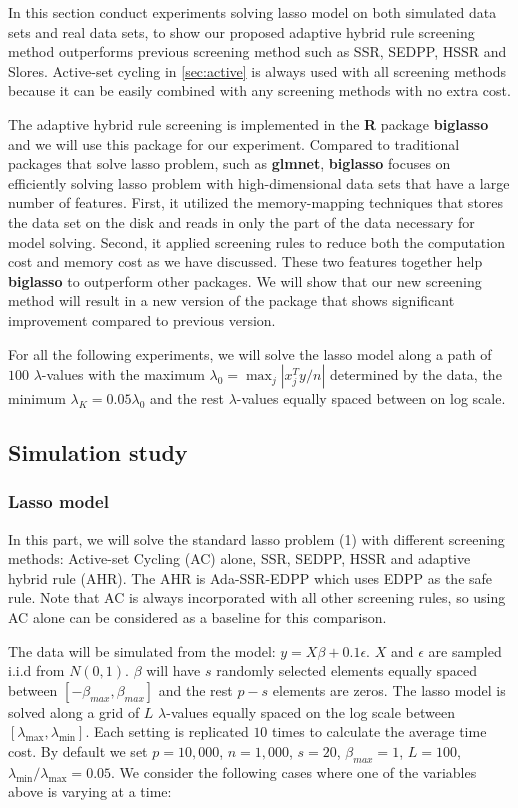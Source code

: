 In this section conduct experiments solving lasso model on both simulated data sets and real data sets, to show our proposed adaptive hybrid rule screening method outperforms previous screening method such as SSR, SEDPP, HSSR and Slores. Active-set cycling in \ref{sec:active} is always used with all screening methods because it can be easily combined with any screening methods with no extra cost.

The adaptive hybrid rule screening is implemented in the \textbf{R} package \textbf{biglasso} and we will use this package for our experiment. Compared to traditional packages that solve lasso problem, such as \textbf{glmnet}, \textbf{biglasso} focuses on efficiently solving lasso problem with high-dimensional data sets that have a large number of features. First, it utilized the memory-mapping techniques that stores the data set on the disk and reads in only the part of the data necessary for model solving. Second, it applied screening rules to reduce both the computation cost and memory cost as we have discussed. These two features together help \textbf{biglasso} to outperform other packages. We will show that our new screening method will result in a new version of the package that shows significant improvement compared to previous version. 

For all the following experiments, we will solve the lasso model along a path of $100$ $\lambda$-values with the maximum $\lambda_0=\max_j|x_j^Ty/n|$ determined by the data, the minimum $\lambda_K=0.05\lambda_0$ and the rest $\lambda$-values equally spaced between on log scale.

\subsection{Simulation study}
\label{sec:sim}

\subsubsection{Lasso model}

In this part, we will solve the standard lasso problem (1) with different screening methods: Active-set Cycling (AC) alone, SSR, SEDPP, HSSR and adaptive hybrid rule (AHR). The AHR is Ada-SSR-EDPP which uses EDPP as the safe rule. Note that AC is always incorporated with all other screening rules, so using AC alone can be considered as a baseline for this comparison.

The data will be simulated from the model: $y=X\beta+0.1\epsilon$. $X$ and $\epsilon$ are sampled i.i.d from $N(0,1)$. $\beta$ will have $s$ randomly selected elements equally spaced between $[-\beta_{max},\beta_{max}]$ and the rest $p-s$ elements are zeros. The lasso model is solved along a grid of $L$ $\lambda$-values equally spaced on the log scale between $[\lambda_{\max},\lambda_{\min}]$. Each setting is replicated $10$ times to calculate the average time cost. By default we set $p=10,000$, $n=1,000$, $s=20$, $\beta_{max}=1$, $L=100$, $\lambda_{\min}/\lambda_{\max}=0.05$. We consider the following cases where one of the variables above is varying at a time:

